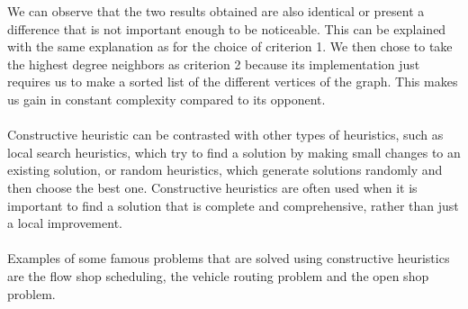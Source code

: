 We can observe that the two results obtained are also identical or present a difference that is not important enough to be noticeable. This can be explained with the same explanation as for the choice of criterion 1. We then chose to take the highest degree neighbors as criterion 2 because its implementation just requires us to make a sorted list of the different vertices of the graph. This makes us gain in constant complexity compared to its opponent.
\\ \\
Constructive heuristic can be contrasted with other types of heuristics, such as local search heuristics, which try to find a solution by making small changes to an existing solution, or random heuristics, which generate solutions randomly and then choose the best one. Constructive heuristics are often used when it is important to find a solution that is complete and comprehensive, rather than just a local improvement.
\\ \\
Examples of some famous problems that are solved using constructive heuristics are the flow shop scheduling, the vehicle routing problem and the open shop problem.

